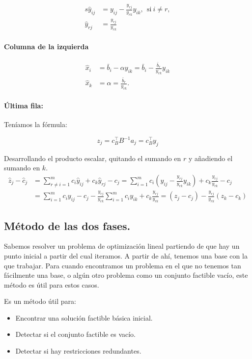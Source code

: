 \begin{align*}
s
\hat{y}_{ij} &= y_{ij} - \frac{y_{rj}}{y_{rk}}y_{ik}, \ \ \mbox{si}\ i\neq r, \\
\hat{y}_{rj} &= \frac{y_{rj}}{y_{rk}}
\end{align*}

\paragraph{Columna de la izquierda}

\begin{align*}
\hat{x}_i &= \bar{b}_i - \alpha y_{ik} = \bar{b}_i - \frac{\bar{b}_r}{y_{rk}} y_{ik}\\
\hat{x}_k &= \alpha = \frac{\bar{b}_r}{y_{rk}}.
\end{align*}

\paragraph{Última fila:}
Teníamos la fórmula:

\[z_j = c^\top_B B^{-1}a_j = c_B^\top y_j\]

Desarrollando el producto escalar, quitando el sumando en $r$ y añadiendo el sumando en $k$.
\begin{align*}
\hat{z}_j - \hat{c}_j &= \sum_{r\neq i=1}^m c_i \hat{y}_{ij} + c_k\hat{y}_{rj} - c_j=
\sum_{i=1}^m c_i \left(y_{ij} - \frac{y_{rj}}{y_{rk}}y_{ik}\right) + c_k\frac{y_{rj}}{y_{rk}} - c_j \\
&= \sum_{i=1}^m c_i y_{ij} - c_j -  \frac{y_{rj}}{y_{rk}} \sum_{i=1}^m c_i y_{ik} + c_k\frac{y_{rj}}{y_{rk}} = (z_j-c_j) - \frac{y_{rj}}{y_{rk}} (z_k-c_k)
\end{align*}


\subsection{Método de las dos fases.}

Sabemos resolver un problema de optimización lineal partiendo de que hay un punto inicial a partir del cual iteramos.
A partir de ahí, tenemos una base con la que trabajar.
Para cuando encontramos un problema en el que no tenemos tan fácilmente una base, o algún otro problema como un conjunto factible vacío, este método es útil para estos casos.


Es un método útil para:

\begin{itemize}
\item Encontrar una solución factible básica inicial.

\item Detectar si el conjunto factible es  vacío.

\item Detectar si hay restricciones redundantes.
\end{itemize}


